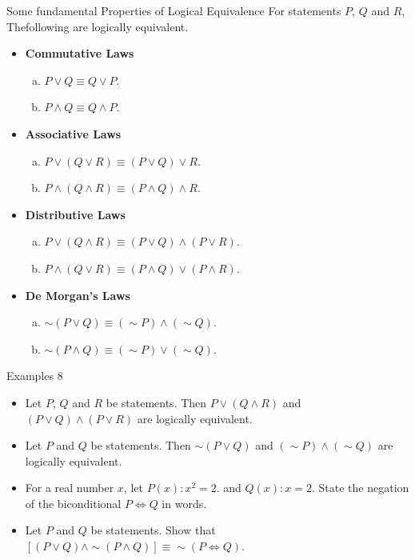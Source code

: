 \documentclass{beamer}
\begin{document}
\begin{frame}{Some fundamental Properties of Logical Equivalence}
For statements $P$, $Q$ and $R$, Thefollowing are logically equivalent.
\begin{itemize}
    \item \textbf{Commutative Laws}
    \begin{enumerate}[(a)]
        \item $P \lor Q \equiv Q \lor P$.
        \item $P \land Q \equiv Q \land P$.
    \end{enumerate}
    \item \textbf{Associative Laws}
    \begin{enumerate}[(a)]
        \item $P \lor (Q \lor R) \equiv (P \lor Q) \lor R$.
        \item $P \land (Q \land R) \equiv (P \land Q) \land R$.
    \end{enumerate}
    \item \textbf{Distributive Laws}
    \begin{enumerate}[(a)]
        \item $P \lor (Q \land R) \equiv (P \lor Q) \land (P \lor R)$.
        \item $P \land (Q \lor R) \equiv (P \land Q) \lor (P \land R)$.
    \end{enumerate}
    \item \textbf{De Morgan’s Laws}
    \begin{enumerate}[(a)]
        \item $\sim (P \lor Q) \equiv (\sim P) \land (\sim Q)$.
        \item $\sim (P \land Q) \equiv (\sim P) \lor (\sim Q)$.
    \end{enumerate}
\end{itemize}
\end{frame}

\begin{frame}{Examples 8}
\begin{itemize}
    \item Let $P$, $Q$ and $R$ be statements. Then $P \lor (Q \land R)$ and $(P \lor Q) \land (P \lor R)$ are logically equivalent.
    \item Let $P$ and $Q$ be statements. Then $\sim (P \lor Q)$ and $(\sim P) \land (\sim Q)$ are logically equivalent.
    \item For a real number $x$, let $P(x): x^2 = 2$. and $Q(x): x = 2$. State the negation of the biconditional $P \Leftrightarrow Q$ in words.
    \item Let $P$ and $Q$ be statements. Show that $[(P \lor Q) \land \sim (P \land Q)] \equiv \sim (P \Leftrightarrow Q)$.
\end{itemize}
\end{frame}
\end{document}

